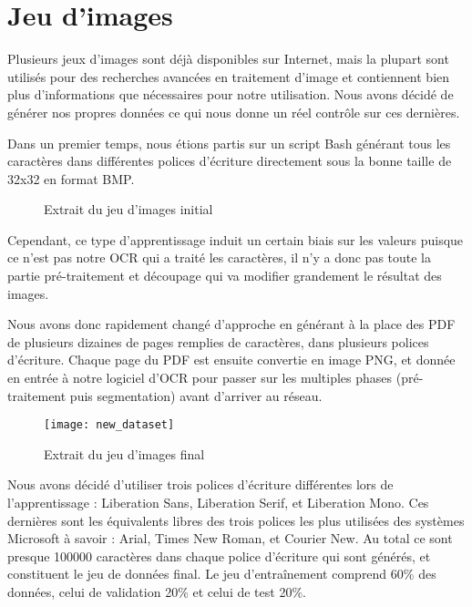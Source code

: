 \section{Jeu d'images}

Plusieurs jeux d'images sont déjà disponibles sur Internet, mais la plupart sont
utilisés pour des recherches avancées en traitement d'image et contiennent bien
plus d'informations que nécessaires pour notre utilisation. Nous avons décidé de
générer nos propres données ce qui nous donne un réel contrôle sur ces
dernières.

Dans un premier temps, nous étions partis sur un script Bash générant tous les
caractères dans différentes polices d'écriture directement sous la bonne taille
de 32x32 en format BMP.

\begin{figure}[H]
    \centering
    \caption{Extrait du jeu d'images initial}
\end{figure}

Cependant, ce type d'apprentissage induit un certain biais sur les valeurs
puisque ce n'est pas notre OCR qui a traité les caractères, il n'y a donc pas
toute la partie pré-traitement et découpage qui va modifier grandement le
résultat des images.

Nous avons donc rapidement changé d'approche en générant à la place des PDF de
plusieurs dizaines de pages remplies de caractères, dans plusieurs polices
d'écriture. Chaque page du PDF est ensuite convertie en image PNG, et donnée en
entrée à notre logiciel d'OCR pour passer sur les multiples phases
(pré-traitement puis segmentation) avant d'arriver au réseau.

\begin{figure}[H]
    \centering
    \texttt{[image: new\_dataset]}
    \caption{Extrait du jeu d'images final}
\end{figure}

Nous avons décidé d'utiliser trois polices d'écriture différentes lors de
l'apprentissage : Liberation Sans, Liberation Serif, et Liberation Mono. Ces
dernières sont les équivalents libres des trois polices les plus utilisées des
systèmes Microsoft à savoir : Arial, Times New Roman, et Courier New. Au total
ce sont presque 100000 caractères dans chaque police d'écriture qui sont
générés, et constituent le jeu de données final. Le jeu d'entraînement comprend
60\% des données, celui de validation 20\% et celui de test 20\%.

